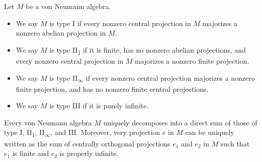 \documentclass[10pt]{mypackage}
\begin{document}
\begin{definition}
  Let $M$ be a von Neumann algebra.
  \begin{itemize}
    \item We say $M$ is type I if every nonzero central projection in $M$ majorizes a nonzero abelian projection in $M$.
    \item We say $M$ is type II\textsubscript{1} if it is finite, has no nonzero abelian projections, and every nonzero central projection in $M$ majorizes a nonzero finite projection.
    \item We say $M$ is type II\textsubscript{$\infty$} if every nonzero central projection majorizes a nonzero finite projection, and has no nonzero finite central projections.
    \item We say $M$ is type III if it is purely infinite.
  \end{itemize}
\end{definition}
\begin{theorem}
  Every von Neumann algebra $M$ uniquely decomposes into a direct sum of those of type I, II\textsubscript{1}, II\textsubscript{$\infty$}, and III. Moreover, very projection $e$ in $M$ can be uniquely written as the sum of centrally orthogonal projections $e_1$ and $e_2$ in $M$ such that $e_1$ is finite and $e_2$ is properly infinite.
\end{theorem}
\end{document}

